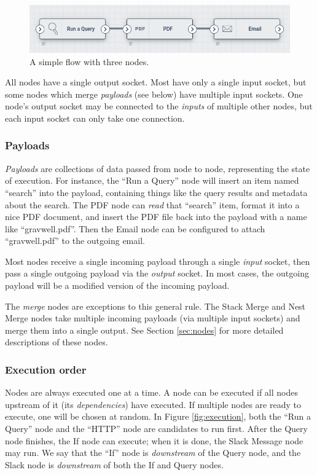 \begin{figure}
	\includegraphics[width=0.7\linewidth]{images/nodes.png}
	\caption{A simple flow with three nodes.}
	\label{fig:nodes}
\end{figure}

All nodes have a single output socket. Most have only a single input socket, but some nodes which merge \emph{payloads} (see below) have multiple input sockets. One node's output socket may be connected to the \emph{inputs} of multiple other nodes, but each input socket can only take one connection.

\subsubsection{Payloads}

\emph{Payloads} are collections of data passed from node to node, representing the state of execution. For instance, the ``Run a Query'' node will insert an item named ``search'' into the payload, containing things like the query results and metadata about the search. The PDF node can \emph{read} that ``search'' item, format it into a nice PDF document, and insert the PDF file back into the payload with a name like ``gravwell.pdf''. Then the Email node can be configured to attach ``gravwell.pdf'' to the outgoing email.

Most nodes receive a single incoming payload through a single \emph{input} socket, then pass a single outgoing payload via the \emph{output} socket. In most cases, the outgoing payload will be a modified version of the incoming payload.

The \emph{merge} nodes are exceptions to this general rule. The Stack Merge and Nest Merge nodes take multiple incoming payloads (via multiple input sockets) and merge them into a single output. See Section \ref{sec:nodes} for more detailed descriptions of these nodes.

\subsubsection{Execution order}

Nodes are always executed one at a time. A node can be executed if all nodes upstream of it (its \emph{dependencies}) have executed. If multiple nodes are ready to execute, one will be chosen at random. In Figure \ref{fig:execution}, both the ``Run a Query'' node and the ``HTTP'' node are candidates to run first. After the Query node finishes, the If node can execute; when it is done, the Slack Message node may run. We say that the ``If'' node is \emph{downstream} of the Query node, and the Slack node is \emph{downstream} of both the If and Query nodes.

